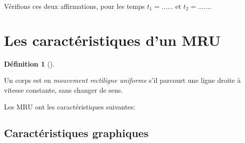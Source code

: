 \documentclass[
  letterpaper,
  DIV=11,
  numbers=noendperiod]{scrartcl}
\theoremstyle{definition}
\theoremstyle{definition}
\newtheorem{definition}{Définition}[section]
\theoremstyle{remark}
\begin{document}
Vérifions ces deux affirmations, pour les temps \(t_1=\ldots\ldots\) et
\(t_2=\ldots\ldots\).

\vspace{2cm}

\section{Les caractéristiques d'un
MRU}\label{les-caractuxe9ristiques-dun-mru}

\begin{definition}[]\protect\hypertarget{def-mru}{}\label{def-mru}

Un corps est en \emph{mouvement rectiligne uniforme} s'il parcourt une
ligne droite à vitesse constante, sans changer de sens.

\end{definition}

Les MRU ont les caractéristiques suivantes:

\subsection{Caractéristiques
graphiques}\label{caractuxe9ristiques-graphiques}
\end{document}
